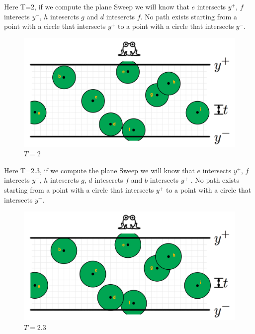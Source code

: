 \documentclass[12pt]{article}
\begin{document}
\noindent Here T=2, if we compute the plane Sweep we will know that $e$ intersects $y^+$, $f$ interects $y^-$, $h$ intesercts $g$ and $d$ intesercts $f$. No path exists starting from a point with a circle that intersects $y^+$ to a point with a circle that intersects $y^-$.
\begin{figure}[H]
	\centering
	\includegraphics[scale=0.3]{img/problem2-T2.png}
	\caption{$T=2$} \label{fig:1d}
\end{figure}

\newpage
\noindent Here T=2.3, if we compute the plane Sweep we will know that $e$ intersects $y^+$, $f$ interects $y^-$, $h$ intesercts $g$, $d$ intesercts $f$ and $b$ intersects $y^+$ . No path exists starting from a point with a circle that intersects $y^+$ to a point with a circle that intersects $y^-$.
	\begin{figure}[H]
	\centering
	\includegraphics[scale=0.3]{img/problem2-T2_3.png}
	\caption{$T=2.3$} \label{fig:1e}
\end{figure}
\end{document}
